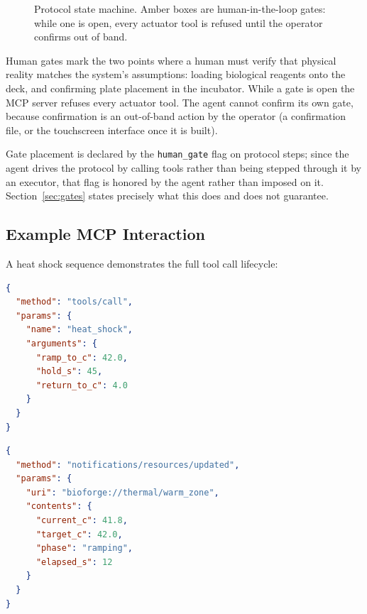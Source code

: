 \documentclass[11pt,letterpaper]{article}
\begin{document}
\begin{figure}[!htbp]
\caption{Protocol state machine. Amber boxes are human-in-the-loop gates: while one is open, every actuator tool is refused until the operator confirms out of band.}
\label{fig:statemachine}
\end{figure}

Human gates mark the two points where a human must verify that physical reality matches the system's assumptions: loading biological reagents onto the deck, and confirming plate placement in the incubator. While a gate is open the MCP server refuses every actuator tool. The agent cannot confirm its own gate, because confirmation is an out-of-band action by the operator (a confirmation file, or the touchscreen interface once it is built).

Gate placement is declared by the \texttt{human\_gate} flag on protocol steps; since the agent drives the protocol by calling tools rather than being stepped through it by an executor, that flag is honored by the agent rather than imposed on it. Section~\ref{sec:gates} states precisely what this does and does not guarantee.


\subsection{Example MCP Interaction}

A heat shock sequence demonstrates the full tool call lifecycle:

\begin{lstlisting}[language=json, title={\small\sffamily Agent $\rightarrow$ MCP Server: Initiate heat shock}]
{
  "method": "tools/call",
  "params": {
    "name": "heat_shock",
    "arguments": {
      "ramp_to_c": 42.0,
      "hold_s": 45,
      "return_to_c": 4.0
    }
  }
}
\end{lstlisting}

\begin{lstlisting}[language=json, title={\small\sffamily MCP Server $\rightarrow$ Agent: Progress notification}]
{
  "method": "notifications/resources/updated",
  "params": {
    "uri": "bioforge://thermal/warm_zone",
    "contents": {
      "current_c": 41.8,
      "target_c": 42.0,
      "phase": "ramping",
      "elapsed_s": 12
    }
  }
}
\end{lstlisting}
\end{document}
